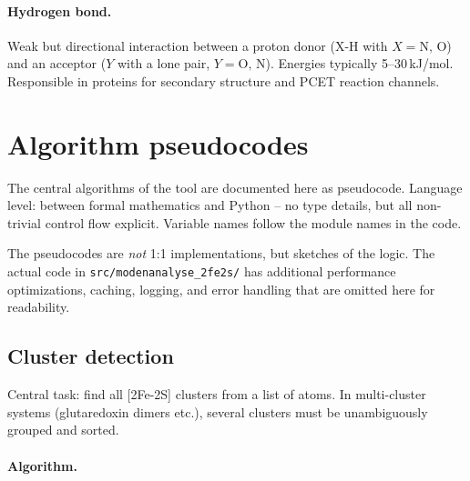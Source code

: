 \documentclass[11pt,a4paper,twoside]{article}
\theoremstyle{remark}
\begin{document}
\paragraph{Hydrogen bond.}
Weak but directional interaction between a proton donor (X-H with
$X = \text{N, O}$) and an acceptor ($Y$ with a lone pair, $Y = \text{O,
N}$). Energies typically 5--30\,kJ/mol. Responsible in proteins for
secondary structure and PCET reaction channels.

\section{Algorithm pseudocodes}
\label{app:pseudocodes}

The central algorithms of the tool are documented here as
pseudocode. Language level: between formal mathematics and Python
-- no type details, but all non-trivial control flow explicit.
Variable names follow the module names in the code.

The pseudocodes are \emph{not} 1:1 implementations, but sketches of
the logic. The actual code in \texttt{src/modenanalyse\_2fe2s/} has
additional performance optimizations, caching, logging, and error
handling that are omitted here for readability.

\subsection{Cluster detection}
\label{app:pseudo-cluster}

Central task: find all [2Fe-2S] clusters from a list of atoms. In
multi-cluster systems (glutaredoxin dimers etc.), several clusters
must be unambiguously grouped and sorted.

\paragraph{Algorithm.}
\end{document}
